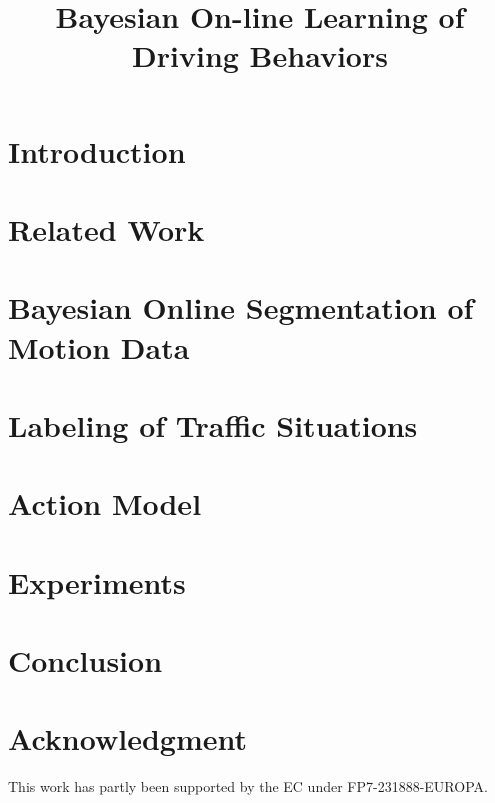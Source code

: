 \documentclass[letterpaper, 10 pt, conference]{sty/ieeeconf}
\begin{document}
\title{\LARGE \bf
Bayesian On-line Learning of Driving Behaviors
}

\author{
}

\maketitle

\begin{abstract}

\end{abstract}

\section{Introduction}


\section{Related Work\label{sec:related}}


\section{Bayesian Online Segmentation of Motion Data\label{sec:motion}}


\section{Labeling of Traffic Situations\label{sec:labeling}}


\section{Action Model\label{sec:action}}


\section{Experiments\label{sec:exp}}


\section{Conclusion\label{sec:conc}}


\section*{Acknowledgment}
This work has partly been supported by the EC under FP7-231888-EUROPA.



\end{document}

